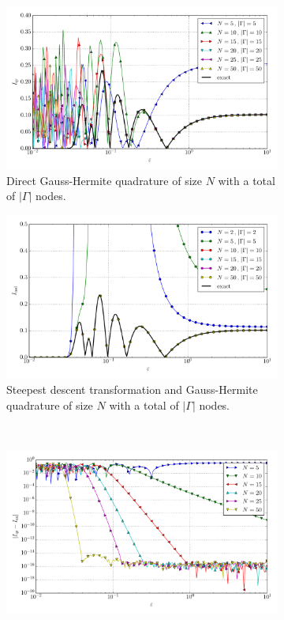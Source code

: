 \documentclass[a4paper,10pt]{article}
\begin{document}
\begin{figure}[ht!]
  \begin{subfigure}[t]{0.5\linewidth}
    \includegraphics[width=\linewidth]{./plots/tp_1d_conv_eps_8_8_val_qr.pdf}
    \caption{Direct Gauss-Hermite quadrature of size $N$ with a total of $|\Gamma|$ nodes.}
    \label{fig:tp_1d_conv_eps_8_8_val_qr}
  \end{subfigure}
  \begin{subfigure}[t]{0.5\linewidth}
    \includegraphics[width=\linewidth]{./plots/tp_1d_conv_eps_8_8_val_nsd.pdf}
    \caption{Steepest descent transformation and Gauss-Hermite quadrature of size $N$ with a total of $|\Gamma|$ nodes.}
    \label{fig:tp_1d_conv_eps_8_8_val_nsd}
  \end{subfigure} \\
  \begin{subfigure}[t]{0.5\linewidth}
    \includegraphics[width=\linewidth]{./plots/tp_1d_conv_eps_8_8_err_qr.pdf}

\end{subfigure}
\end{figure}
\end{document}
